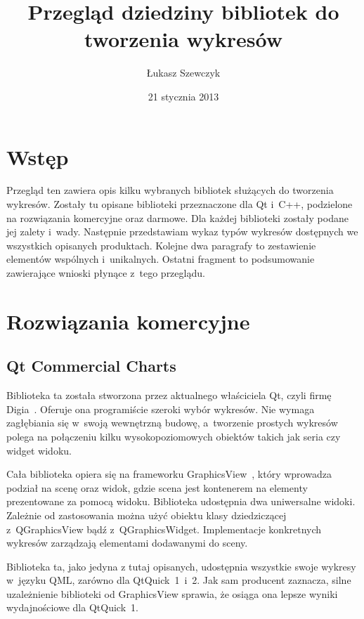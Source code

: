 \documentclass[11pt,twoside,a4paper,final]{llncs}
\begin{document}
\date{21 stycznia 2013}
\title{Przegląd dziedziny bibliotek do tworzenia wykresów}

\author{Łukasz Szewczyk}
\maketitle


\section{Wstęp}
Przegląd ten zawiera opis kilku wybranych bibliotek służących do tworzenia wykresów. Zostały tu opisane biblioteki przeznaczone dla Qt i~C++, podzielone na rozwiązania komercyjne oraz darmowe. Dla każdej biblioteki zostały podane jej zalety i~wady. Następnie przedstawiam wykaz typów wykresów dostępnych we wszystkich opisanych produktach. Kolejne dwa paragrafy to zestawienie elementów wspólnych i~unikalnych. Ostatni fragment to podsumowanie zawierające wnioski płynące z~tego przeglądu.

\section{Rozwiązania komercyjne}
\subsection{Qt Commercial Charts}
Biblioteka ta została stworzona przez aktualnego właściciela Qt, czyli firmę Digia~\cite{digia}. Oferuje ona programiście szeroki wybór wykresów. Nie wymaga zagłębiania się w~swoją wewnętrzną budowę, a~tworzenie prostych wykresów polega na połączeniu kilku wysokopoziomowych obiektów takich jak seria czy widget widoku.\newline

Cała biblioteka opiera się na frameworku GraphicsView~\cite{graphicsview}, który wprowadza podział na scenę oraz widok, gdzie scena jest kontenerem na elementy prezentowane za pomocą widoku.
Biblioteka udostępnia dwa uniwersalne widoki. Zależnie od zastosowania można użyć obiektu klasy dziedziczącej z~QGraphicsView bądź z~QGraphicsWidget. Implementacje konkretnych wykresów zarządzają elementami dodawanymi do sceny.\newline

Biblioteka ta, jako jedyna z tutaj opisanych, udostępnia wszystkie swoje wykresy w~języku QML, zarówno dla QtQuick~1~i~2.
Jak sam producent zaznacza, silne uzależnienie biblioteki od GraphicsView sprawia, że osiąga ona lepsze wyniki wydajnościowe dla QtQuick~1.\newline
\end{document}

